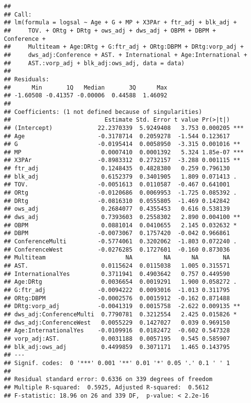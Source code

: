 \documentclass[]{article}
\begin{document}
\begin{verbatim}
## 
## Call:
## lm(formula = logsal ~ Age + G + MP + X3PAr + ftr_adj + blk_adj + 
##     TOV. + ORtg + DRtg + ows_adj + dws_adj + OBPM + DBPM + Conference + 
##     Multiteam + Age:DRtg + G:ftr_adj + ORtg:DBPM + DRtg:vorp_adj + 
##     dws_adj:Conference + AST. + International + Age:International + 
##     AST.:vorp_adj + blk_adj:ows_adj, data = data)
## 
## Residuals:
##      Min       1Q   Median       3Q      Max 
## -1.60508 -0.41357 -0.00006  0.44588  1.46092 
## 
## Coefficients: (1 not defined because of singularities)
##                           Estimate Std. Error t value Pr(>|t|)    
## (Intercept)             22.2370339  5.9249408   3.753 0.000205 ***
## Age                     -0.3178714  0.2059278  -1.544 0.123617    
## G                       -0.0195414  0.0058950  -3.315 0.001016 ** 
## MP                       0.0007410  0.0001392   5.324 1.85e-07 ***
## X3PAr                   -0.8983312  0.2732157  -3.288 0.001115 ** 
## ftr_adj                  0.1248435  0.4828380   0.259 0.796130    
## blk_adj                  0.6152379  0.3401905   1.809 0.071413 .  
## TOV.                    -0.0051613  0.0110587  -0.467 0.641001    
## ORtg                    -0.0120686  0.0069953  -1.725 0.085392 .  
## DRtg                    -0.0816310  0.0555805  -1.469 0.142842    
## ows_adj                  0.2684077  0.4355453   0.616 0.538139    
## dws_adj                  0.7393603  0.2558302   2.890 0.004100 ** 
## OBPM                     0.0881014  0.0410655   2.145 0.032632 *  
## DBPM                    -0.0073067  0.1757420  -0.042 0.966861    
## ConferenceMulti         -0.5774061  0.3202062  -1.803 0.072240 .  
## ConferenceWest          -0.0276285  0.1727601  -0.160 0.873036    
## Multiteam                       NA         NA      NA       NA    
## AST.                     0.0115624  0.0115038   1.005 0.315571    
## InternationalYes         0.3711941  0.4903642   0.757 0.449590    
## Age:DRtg                 0.0036654  0.0019291   1.900 0.058272 .  
## G:ftr_adj               -0.0094222  0.0093016  -1.013 0.311795    
## ORtg:DBPM               -0.0002576  0.0015912  -0.162 0.871488    
## DRtg:vorp_adj           -0.0041319  0.0015758  -2.622 0.009135 ** 
## dws_adj:ConferenceMulti  0.7790781  0.3212554   2.425 0.015826 *  
## dws_adj:ConferenceWest   0.0055229  0.1427027   0.039 0.969150    
## Age:InternationalYes    -0.0109916  0.0182472  -0.602 0.547328    
## vorp_adj:AST.            0.0031188  0.0057195   0.545 0.585907    
## blk_adj:ows_adj          0.4499859  0.3071171   1.465 0.143795    
## ---
## Signif. codes:  0 '***' 0.001 '**' 0.01 '*' 0.05 '.' 0.1 ' ' 1
## 
## Residual standard error: 0.6336 on 339 degrees of freedom
## Multiple R-squared:  0.5925, Adjusted R-squared:  0.5612 
## F-statistic: 18.96 on 26 and 339 DF,  p-value: < 2.2e-16
\end{verbatim}
\end{document}
